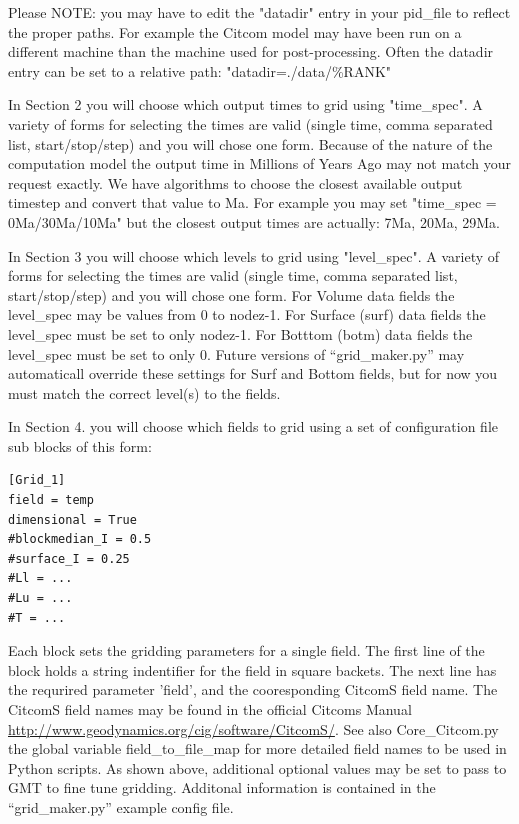 \documentclass[letterpaper,12pt]{article}
\begin{document}
Please NOTE: you may have to edit the "datadir" entry in your pid\_file to reflect the proper paths.
For example the Citcom model may have been run on a different machine than the machine used for post-processing.
Often the datadir entry can be set to a relative path: "datadir=./data/\%RANK"

In Section 2 you will choose which output times to grid using "time\_spec".
A variety of forms for selecting the times are valid (single time, comma separated list, start/stop/step) and you will chose one form.  
Because of the nature of the computation model the output time in Millions of Years Ago may not match your request exactly.  
We have algorithms to choose the closest available output timestep and convert that value to Ma.  
For example you may set "time\_spec = 0Ma/30Ma/10Ma" but the closest output times are actually: 7Ma, 20Ma, 29Ma.

In Section 3 you will choose which levels to grid using "level\_spec".
A variety of forms for selecting the times are valid (single time, comma separated list, start/stop/step) and you will chose one form.
For Volume data fields the level\_spec may be values from 0 to nodez-1.
For Surface (surf) data fields the level\_spec must be set to only nodez-1.
For Botttom (botm) data fields the level\_spec must be set to only 0.
Future versions of ``grid\_maker.py'' may automaticall override these settings for Surf and Bottom fields, but for now you must match the correct level(s) to the fields.

In Section 4. you will choose which fields to grid using a set of configuration file sub blocks of this form:

\begin{verbatim}
[Grid_1]
field = temp
dimensional = True
#blockmedian_I = 0.5
#surface_I = 0.25
#Ll = ...
#Lu = ...
#T = ...
\end{verbatim}

Each block sets the gridding parameters for a single field.
The first line of the block holds a string indentifier for the field in square backets.
The next line has the requrired parameter 'field', and the cooresponding CitcomS field name. 
The CitcomS field names may be found in the official Citcoms Manual 
\url{http://www.geodynamics.org/cig/software/CitcomS/}.  
See also Core\_Citcom.py the global variable field\_to\_file\_map for more detailed field names to be used in Python scripts.
As shown above, additional optional values may be set to pass to GMT to fine tune gridding.
Additonal information is contained in the ``grid\_maker.py'' example config file.
\end{document}
